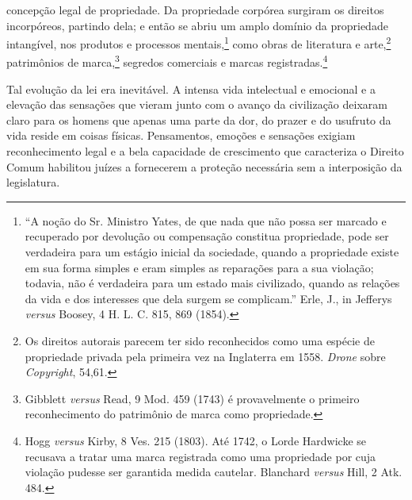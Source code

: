 concepção legal de propriedade. Da propriedade corpórea surgiram os
direitos incorpóreos, partindo dela; e então se abriu um amplo domínio
da propriedade intangível, nos produtos e processos mentais,\footnote{``A
  noção do Sr. Ministro Yates, de que nada que não possa ser marcado e
  recuperado por devolução ou compensação constitua propriedade, pode
  ser verdadeira para um estágio inicial da sociedade, quando a
  propriedade existe em sua forma simples e eram simples as reparações
  para a sua violação; todavia, não é verdadeira para um estado mais
  civilizado, quando as relações da vida e dos interesses que dela
  surgem se complicam.'' Erle, J., in Jefferys \emph{versus} Boosey, 4
  H. L. C. 815, 869 (1854).} como obras de literatura e arte,\footnote{Os
  direitos autorais parecem ter sido reconhecidos como uma espécie de
  propriedade privada pela primeira vez na Inglaterra em 1558.
  \emph{Drone} sobre \emph{Copyright}, 54,61.} patrimônios de
marca,\footnote{Gibblett \emph{versus} Read, 9 Mod. 459 (1743) é
  provavelmente o primeiro reconhecimento do patrimônio de marca como
  propriedade.} segredos comerciais e marcas registradas.\footnote{Hogg
  \emph{versus} Kirby, 8 Ves. 215 (1803). Até 1742, o Lorde Hardwicke se
  recusava a tratar uma marca registrada como uma propriedade por cuja
  violação pudesse ser garantida medida cautelar. Blanchard
  \emph{versus} Hill, 2 Atk. 484.}

Tal evolução da lei era inevitável. A intensa vida intelectual e
emocional e a elevação das sensações que vieram junto com o avanço da
civilização deixaram claro para os homens que apenas uma parte da dor,
do prazer e do usufruto da vida reside em coisas físicas. Pensamentos,
emoções e sensações exigiam reconhecimento legal e a bela capacidade de
crescimento que caracteriza o Direito Comum habilitou juízes a
fornecerem a proteção necessária sem a interposição da legislatura.

